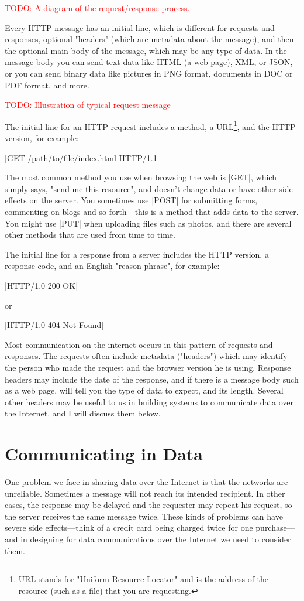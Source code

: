 \documentclass[11pt]{book}
\newcommand{\todo}[1]{\textcolor{red}{TODO: #1}} %
\begin{document}
\todo{A diagram of the request/response process.}

Every HTTP message has an initial line, which is different for requests and responses, optional "headers" (which are metadata about the message), and then the optional main body of the message, which may be any type of data.  In the message body you can send text data like HTML (a web page), XML, or JSON, or you can send binary data like pictures in PNG format, documents in DOC or PDF format, and more.

\todo{Illustration of typical request message}

The initial line for an HTTP request includes a method, a URL\footnote{URL stands for "Uniform Resource Locator" and is the address of the resource (such as a file) that you are requesting.}, and the HTTP version, for example:

|GET /path/to/file/index.html HTTP/1.1|

The most common method you use when browsing the web is |GET|, which simply says, "send me this resource", and doesn't change data or have other side effects on the server.  You sometimes use |POST| for submitting forms, commenting on blogs and so forth---this is a method that adds data to the server.  You might use |PUT| when uploading files such as photos, and there are several other methods that are used from time to time.

The initial line for a response from a server includes the HTTP version, a response code, and an English "reason phrase", for example:

|HTTP/1.0 200 OK|

or

|HTTP/1.0 404 Not Found|

Most communication on the internet occurs in this pattern of requests and responses.  The requests often include metadata ("headers") which may identify the person who made the request and the browser version he is using.  Response headers may include the date of the response, and if there is a message body such as a web page, will tell you the type of data to expect, and its length.  Several other headers may be useful to us in building systems to communicate data over the Internet, and I will discuss them below.

\section{Communicating in Data}

One problem we face in sharing data over the Internet is that the networks are unreliable.  Sometimes a message will not reach its intended recipient.  In other cases, the response may be delayed and the requester may repeat his request, so the server receives the same message twice.  These kinds of problems can have severe side effects---think of a credit card being charged twice for one purchase---and in designing for data communications over the Internet we need to consider them.
\end{document}

